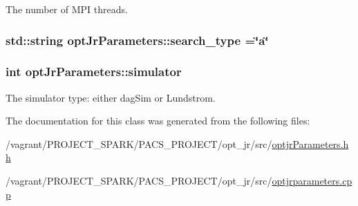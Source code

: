 The number of M\-P\-I threads. 

\hypertarget{classoptJrParameters_ace4df9a02106cc7c3f7e8e65cb94770f}{
\subsubsection[{search\-\_\-type}]{\setlength{\rightskip}{0pt plus 5cm}std\-::string opt\-Jr\-Parameters\-::search\-\_\-type =\char`\"{}a\char`\"{}\hspace{0.3cm}{\ttfamily [private]}}}\label{classoptJrParameters_ace4df9a02106cc7c3f7e8e65cb94770f}
\hypertarget{classoptJrParameters_a8bb0a0aa1f458ff3973fbe43552e1cd5}{
\subsubsection[{simulator}]{\setlength{\rightskip}{0pt plus 5cm}int opt\-Jr\-Parameters\-::simulator\hspace{0.3cm}{\ttfamily [private]}}}\label{classoptJrParameters_a8bb0a0aa1f458ff3973fbe43552e1cd5}


The simulator type\-: either dag\-Sim or Lundstrom. 



The documentation for this class was generated from the following files\-:\begin{DoxyCompactItemize}
\item 
/vagrant/\-P\-R\-O\-J\-E\-C\-T\-\_\-\-S\-P\-A\-R\-K/\-P\-A\-C\-S\-\_\-\-P\-R\-O\-J\-E\-C\-T/opt\-\_\-jr/src/\hyperlink{optjrParameters_8hh}{optjr\-Parameters.\-hh}\item 
/vagrant/\-P\-R\-O\-J\-E\-C\-T\-\_\-\-S\-P\-A\-R\-K/\-P\-A\-C\-S\-\_\-\-P\-R\-O\-J\-E\-C\-T/opt\-\_\-jr/src/\hyperlink{optjrparameters_8cpp}{optjrparameters.\-cpp}\end{DoxyCompactItemize}

